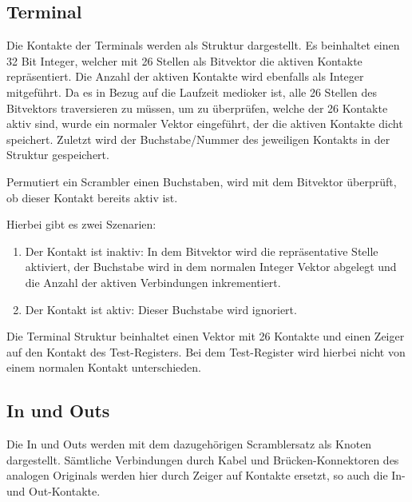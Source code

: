 \subsection{Terminal}\label{subsec:impl_terminal}
Die Kontakte der Terminals werden als Struktur dargestellt.
Es beinhaltet einen 32 Bit Integer, welcher mit 26 Stellen als Bitvektor die aktiven Kontakte repräsentiert.
Die Anzahl der aktiven Kontakte wird ebenfalls als Integer mitgeführt.
Da es in Bezug auf die Laufzeit medioker ist, alle 26 Stellen des Bitvektors traversieren zu müssen, um zu überprüfen, welche der 26 Kontakte aktiv sind, wurde ein normaler Vektor eingeführt, der die aktiven Kontakte \glqq dicht\grqq{} speichert.
Zuletzt wird der Buchstabe/Nummer des jeweiligen Kontakts in der Struktur gespeichert.

\noindent


Permutiert ein Scrambler einen Buchstaben, wird mit dem Bitvektor überprüft, ob dieser Kontakt bereits aktiv ist.

Hierbei gibt es zwei Szenarien:
\begin{enumerate}
	\item Der Kontakt ist inaktiv: In dem Bitvektor wird die repräsentative Stelle aktiviert, der Buchstabe wird in dem normalen Integer Vektor abgelegt und die Anzahl der aktiven Verbindungen inkrementiert.
	
	\item Der Kontakt ist aktiv: Dieser Buchstabe wird ignoriert. 
\end{enumerate}

Die Terminal Struktur beinhaltet einen Vektor mit 26 Kontakte und einen Zeiger auf den Kontakt des Test-Registers.
Bei dem Test-Register wird hierbei nicht von einem \glqq normalen\grqq{} Kontakt unterschieden.


\subsection{In und Outs}\label{subsec:impl_in_und_outs}
Die In und Outs werden mit dem dazugehörigen Scramblersatz als Knoten dargestellt.
Sämtliche Verbindungen durch Kabel und Brücken-Konnektoren des analogen Originals werden hier durch Zeiger auf Kontakte ersetzt, so auch die In- und Out-Kontakte.

